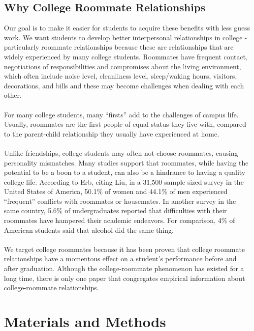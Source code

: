 \documentclass[journal]{./IEEE/IEEEtran}
\begin{document}
\subsection{Why College Roommate Relationships}
Our goal is to make it easier for students to acquire these benefits with less guess work. We want students to develop better interpersonal relationships in college - particularly roommate relationships because these are relationships that are widely experienced by many college students\cite{erb}. Roommates have frequent contact, negotiations of responsibilities and compromises about the living environment, which often include noise level, cleanliness level, sleep/waking hours, visitors, decorations, and bills\cite{erb} and these may become challenges when dealing with each other.
\\
\\
For many college students, many “firsts” add to the challenges of campus life. Usually, roommates are the first people of equal status they live with, compared to the parent-child relationship they usually have experienced at home\cite{erb}.
\\
\\
Unlike friendships, college students may often not choose roommates, causing personality mismatches. Many studies support that roommates, while having the potential to be a boon to a student, can also be a hindrance to having a quality college life. According to Erb\cite{erb}, citing Liu\cite{liu}, in a 31,500 sample sized survey in the United States of America, 50.1\% of women and 44.1\% of men experienced “frequent” conflicts with roommates or housemates. In another survey in the same country, 5.6\% of undergraduates reported that difficulties with their roommates have hampered their academic endeavors\cite{erb}. For comparison, 4\% of American students said that alcohol did the same thing\cite{erb}.
\\
\\
We target college roommates because it has been proven that college roommate relationships have a momentous effect on a student's performance before and after graduation. Although the college-roommate phenomenon has existed for a long time, there is only one paper that congregates empirical information about college-roommate relationships\cite{erb}.

\section{Materials and Methods}
\end{document}
